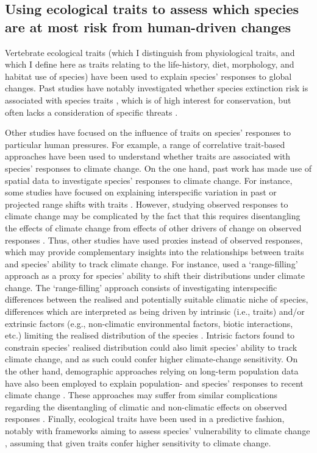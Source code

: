 \subsection{Using ecological traits to assess which species are at most risk from human-driven changes}

Vertebrate ecological traits (which I distinguish from physiological traits, and which I define here as traits relating to the life-history, diet, morphology, and habitat use of species) have been used to explain species' responses to global changes. Past studies have notably investigated whether species extinction risk is associated with species traits \citep{Lebreton2011, Ripple2017, Chichorro2019}, which is of high interest for conservation, but often lacks a consideration of specific threats \citep{GonzalezSuarez2013}. 

Other studies have focused on the influence of traits on species' responses to particular human pressures. For example, a range of correlative trait-based approaches have been used to understand whether traits are associated with species' responses to climate change. 
On the one hand, past work has made use of spatial data to investigate species' responses to climate change. For instance, some studies have focused on explaining interspecific variation in past or projected range shifts with traits \citep{Schloss2012, Mccain2014, Pacifici2017, DiMarco2021}. 
However, studying observed responses to climate change may be complicated by the fact that this requires disentangling the effects of climate change from effects of other drivers of change on observed responses \citep{MacLean2017}. Thus, other studies have used proxies instead of observed responses, which may provide complementary insights into the relationships between traits and species' ability to track climate change. For instance, \citet{Estrada2018} used a `range-filling' approach as a proxy for species' ability to shift their distributions under climate change. The `range-filling' approach consists of investigating interspecific differences between the realised and potentially suitable climatic niche of species, differences which are interpreted as being driven by intrinsic (i.e., traits) and/or extrinsic factors (e.g., non-climatic environmental factors, biotic interactions, etc.) limiting the realised distribution of the species \citep{Estrada2018, Svenning2004}. Intrisic factors found to constrain species' realised distribution could also limit species' ability to track climate change, and as such could confer higher climate-change sensitivity.
On the other hand, demographic approaches relying on long-term population data have also been employed to explain population- and species' responses to recent climate change \citep{Spooner2018}. These approaches may suffer from similar complications regarding the disentangling of climatic and non-climatic effects on observed responses \citep{Williams2022}. 
Finally, ecological traits have been used in a predictive fashion, notably with frameworks aiming to assess species' vulnerability to climate change \citep{Foden2013, Pacifici2015}, assuming that given traits confer higher sensitivity to climate change. 

